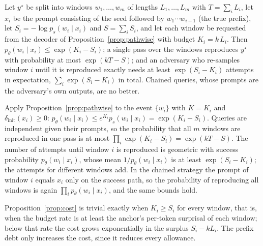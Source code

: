 \begin{proposition}\label{prop:cost}
Let $y^\star$ be split into windows $w_1, \dots, w_m$ of lengths $L_1, \dots, L_m$ with $T = \sum_i L_i$, let $x_i$ be the prompt consisting of the seed followed by $w_1 \cdots w_{i-1}$ (the true prefix), let $S_i = -\log p_s(w_i \mid x_i)$ and $S = \sum_i S_i$, and let each window be requested from the decoder of Proposition~\ref{prop:pathwise} with budget $K_i = k\,L_i$. Then $p_\theta(w_i \mid x_i) \le \exp(K_i - S_i)$; a single pass over the windows reproduces $y^\star$ with probability at most $\exp(kT - S)$; and an adversary who re-samples window $i$ until it is reproduced exactly needs at least $\exp(S_i - K_i)$ attempts in expectation, $\sum_i \exp(S_i - K_i)$ in total. Chained queries, whose prompts are the adversary's own outputs, are no better.
\end{proposition}
\begin{IEEEproof}
Apply Proposition~\ref{prop:pathwise} to the event $\{w_i\}$ with $K = K_i$ and $\delta_{\mathrm{init}}(x_i) \ge 0$: $p_\theta(w_i \mid x_i) \le e^{K_i} p_s(w_i \mid x_i) = \exp(K_i - S_i)$. Queries are independent given their prompts, so the probability that all $m$ windows are reproduced in one pass is at most $\prod_i \exp(K_i - S_i) = \exp(kT - S)$. The number of attempts until window $i$ is reproduced is geometric with success probability $p_\theta(w_i \mid x_i)$, whose mean $1/p_\theta(w_i \mid x_i)$ is at least $\exp(S_i - K_i)$; the attempts for different windows add. In the chained strategy the prompt of window $i$ equals $x_i$ only on the success path, so the probability of reproducing all windows is again $\prod_i p_\theta(w_i \mid x_i)$, and the same bounds hold.
\end{IEEEproof}
Proposition~\ref{prop:cost} is trivial exactly when $K_i \ge S_i$ for every window, that is, when the budget rate is at least the anchor's per-token surprisal of each window; below that rate the cost grows exponentially in the surplus $S_i - kL_i$. The prefix debt only increases the cost, since it reduces every allowance.

